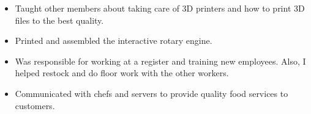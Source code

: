 \documentclass[10pt,a4paper]{altacv}
\begin{document}


\begin{itemize}
  \item Taught other members about taking care of 3D printers and how to print 3D files to the best quality. 
  \item Printed and assembled the interactive rotary engine.
  
\end{itemize}





\begin{itemize}
	\item Was responsible for working at a register and training new employees. Also, I helped restock and do floor work with the other workers. 
\end{itemize}
\smallskip
%


\begin{itemize}
	\item Communicated with chefs and servers to provide quality food services to customers.
\end{itemize}
%
\end{document}

